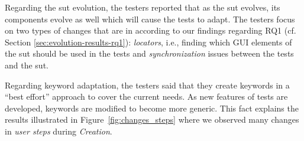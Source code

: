Regarding the \gls{sut} evolution, the testers reported that as the \gls{sut} evolves, its components evolve as well which will cause the tests to adapt. The testers focus on two types of changes that are in according to our findings regarding RQ1 (cf. Section \ref{sec:evolution-results-rq1}): \emph{locators}, i.e., finding which GUI elements of the \gls{sut} should be used in the tests and \emph{synchronization} issues between the tests and the \gls{sut}.

Regarding keyword adaptation, the testers said that they create keywords in a ``best effort'' approach to cover the current needs. As new features of tests are developed, keywords are modified to become more generic. This fact explains the results illustrated in Figure~\ref{fig:changes_steps} where we observed many changes in \emph{user steps} during \emph{Creation}.